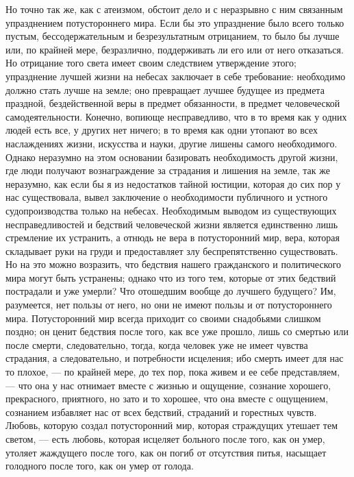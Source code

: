 \documentclass[12pt]{article}
\begin{document}
Но точно так же, как с атеизмом, обстоит дело и с неразрывно с ним связанным упразднением потустороннего мира. Если бы это упразднение было всего только пустым, бессодержательным и безрезультатным отрицанием, то было бы лучше или, по крайней мере, безразлично, поддерживать ли его или от него отказаться. Но отрицание того света имеет своим следствием утверждение этого; упразднение лучшей жизни на небесах заключает в себе требование: необходимо должно стать лучше на земле; оно превращает лучшее будущее из предмета праздной, бездейственной веры в предмет обязанности, в предмет человеческой самодеятельности. Конечно, вопиюще несправедливо, что в то время как у одних людей есть все, у других нет ничего; в то время как одни утопают во всех наслаждениях жизни, искусства и науки, другие лишены самого необходимого. Однако неразумно на этом основании базировать необходимость другой жизни, где люди получают вознаграждение за страдания и лишения на земле, так же неразумно, как если бы я из недостатков тайной юстиции, которая до сих пор у нас существовала, вывел заключение о необходимости публичного и устного судопроизводства только на небесах. Необходимым выводом из существующих несправедливостей и бедствий человеческой жизни является единственно лишь стремление их устранить, а отнюдь не вера в потусторонний мир, вера, которая складывает руки на груди и предоставляет злу беспрепятственно существовать. Но на это можно возразить, что бедствия нашего гражданского и политического мира могут быть устранены; однако что из того тем, которые от этих бедствий пострадали и уже умерли? Что отошедшим вообще до лучшего будущего? Им, разумеется, нет пользы от него, но они не имеют пользы и от потустороннего мира. Потусторонний мир всегда приходит со своими снадобьями слишком поздно; он ценит бедствия после того, как все уже прошло, лишь со смертью или после смерти, следовательно, тогда, когда человек уже не имеет чувства страдания, а следовательно, и потребности исцеления; ибо смерть имеет для нас то плохое, --- по крайней мере, до тех пор, пока живем и ее себе представляем, --- что она у нас отнимает вместе с жизнью и ощущение, сознание хорошего, прекрасного, приятного, но зато и то хорошее, что она вместе с ощущением, сознанием избавляет нас от всех бедствий, страданий и горестных чувств. Любовь, которую создал потусторонний мир, которая страждущих утешает тем светом, --- есть любовь, которая исцеляет больного после того, как он умер, утоляет жаждущего после того, как он погиб от отсутствия питья, насыщает голодного после того, как он умер от голода. 
\end{document}
